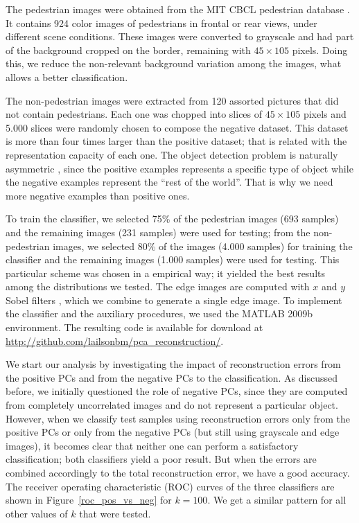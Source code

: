 \documentclass[10pt, conference, compsocconf]{IEEEtran}
\begin{document}
The pedestrian images were obtained from the MIT CBCL pedestrian database \cite{cbcl}. It contains 924 color images of pedestrians in frontal or rear views, under different scene conditions. These images were converted to grayscale and had part of the background cropped on the border, remaining with $45 \times 105$ pixels. Doing this, we reduce the non-relevant background variation among the images, what allows a better classification.

The non-pedestrian images were extracted from 120 assorted pictures that did not contain pedestrians. Each one was chopped into slices of $45 \times 105$ pixels and 5.000 slices were randomly chosen to compose the negative dataset. This dataset is more than four times larger than the positive dataset; that is related with the representation capacity of each one. The object detection problem is naturally asymmetric \cite{jiang09}, since the positive examples represents a specific type of object while the negative examples represent the ``rest of the world''. That is why we need more negative examples than positive ones.

To train the classifier, we selected 75\% of the pedestrian images (693 samples) and the remaining images (231 samples) were used  for testing; from the non-pedestrian images, we selected 80\% of the images (4.000 samples) for training the classifier and the remaining images (1.000 samples) were used for testing. This particular scheme was chosen in a empirical way; it yielded the best results among the distributions we tested. The edge images are computed with $x$ and $y$ Sobel filters \cite{gonzalez01}, which we combine to generate a single edge image. To implement the classifier and the auxiliary procedures, we used the MATLAB 2009b environment. The resulting code is available for download at \url{http://github.com/lailsonbm/pca_reconstruction/}.

We start our analysis by investigating the impact of reconstruction errors from the positive PCs and from the negative PCs to the classification. As discussed before, we initially questioned the role of negative PCs, since they are computed from completely uncorrelated images and do not represent a particular object. However, when we classify test samples using reconstruction errors only from the positive PCs or only from the negative PCs (but still using grayscale and edge images), it becomes clear that neither one can perform a satisfactory classification; both classifiers yield a poor result. But when the errors are combined accordingly to the total reconstruction error, we have a good accuracy. The receiver operating characteristic (ROC) curves of the three classifiers are shown in Figure~\ref{roc_pos_vs_neg} for $k = 100$. We get a similar pattern for all other values of $k$ that were tested.
\end{document}
